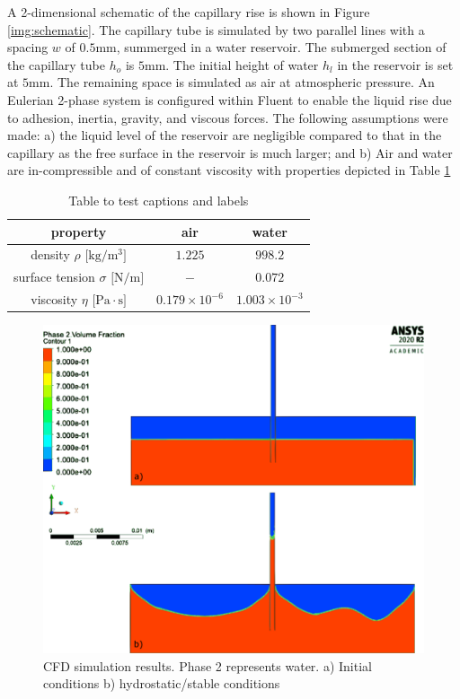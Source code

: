 \documentclass{article}
\begin{document}
A 2-dimensional schematic of the capillary rise is shown in Figure \ref{img:schematic}. The capillary tube is simulated by two parallel lines with a spacing $w$ of $0.5 \textrm{mm}$, summerged in a water reservoir. The submerged section of the capillary tube $h_o$ is $5 \textrm{mm}$. The initial height of water $h_l$ in the reservoir is set at $5 \textrm{mm}$. The remaining space is simulated as air at atmospheric pressure. An Eulerian 2-phase system is configured within Fluent to enable the liquid rise due to adhesion, inertia, gravity, and viscous forces. The following assumptions were made: a) the liquid level of the reservoir are negligible compared to that in the capillary as the free surface in the reservoir is much larger; and b) Air and water are in-compressible and of constant viscosity with properties depicted in Table \ref{tab:materials}

\begin{table}[h!]
\centering
\begin{tabular}{ccc} 
 \hline
 property & air & water \\
 \hline
 density $\rho \textrm{ [kg} / \textrm{m}^3 \textrm{]}$ & $1.225$                & $998.2$ \\ 
 surface tension $\sigma \textrm{ [N} / \textrm{m]}$    & $-$                    & $0.072$ \\
 viscosity $\eta \textrm{ [Pa} \cdot \textrm{s]}$       & $0.179 \times 10^{-6}$ & $1.003 \times 10^{-3}$ \\
 \hline
\end{tabular}
\caption{Table to test captions and labels}
\label{tab:materials}
\end{table}

\begin{figure}[h!]
	\centering
	\includegraphics[width=1.00\textwidth]{./SimStoE.png}
	\caption{CFD simulation results. Phase 2 represents water. a) Initial conditions b) hydrostatic/stable conditions}
	\label{img:CFDresults}
\end{figure}
\end{document}
